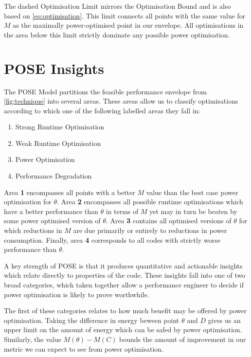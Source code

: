 The dashed Optimisation Limit  mirrors the Optimisation Bound and is also based on \autoref{eq:optimisation}.
This limit connects all points with the same value for $M$ as the maximally power-optimised point in our envelope.
All optimisations in the area below this limit strictly dominate any possible power optimisation.

\section{POSE Insights}
\label{sec:insights}
The POSE Model partitions the feasible performance envelope from \autoref{fig:technique} into several areas.
These areas allow us to classify optimisations according to which one of the following labelled areas they fall in:

\begin{multicols}{2}
\begin{enumerate}
\item Strong Runtime Optimisation
\item Weak Runtime Optimisation
\item Power Optimisation
\item Performance Degradation  
\end{enumerate}
\end{multicols}
Area \textbf{1} encompasses all points with a better $M$ value than the best case power optimisation for $\theta$.
Area \textbf{2} encompasses all possible runtime optimisations which have a better performance than $\theta$ in terms of $M$ yet may in turn be beaten by some power optimised version of $\theta$.
Area \textbf{3} contains all optimised versions of $\theta$ for which reductions in $M$ are due primarily or entirely to reductions in power consumption.
Finally, area \textbf{4} corresponds to all codes with strictly worse performance than $\theta$.

A key strength of POSE is that it produces quantitative and actionable insights which relate directly to properties of the code.
These insights fall into one of two broad categories, which taken together allow a performance engineer to decide if power optimisation is likely to prove worthwhile.

The first of these categories relates to how much benefit may be offered by power optimisation.
Taking the difference in energy beween point $\theta$ and $D$ gives us an upper limit on the amount of energy which can be safed by power optimisation. 
Similarly, the value $M(\theta) - M(C)$ bounds the amount of improvement in our metric we can expect to see from power optimisation.

